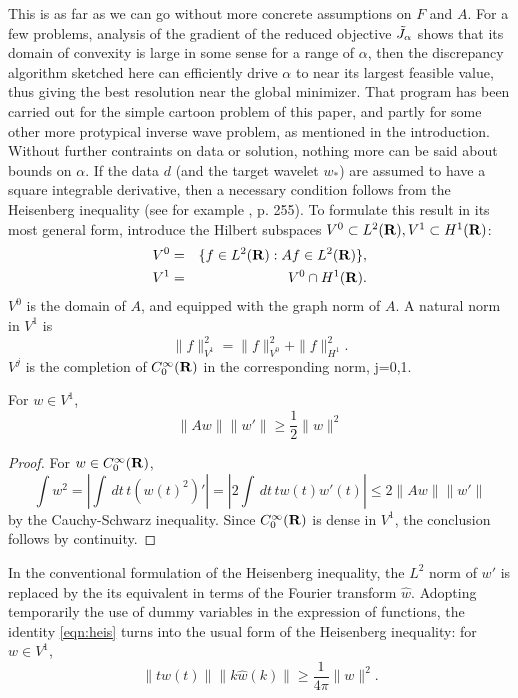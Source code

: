 This is as far as we can go without more concrete assumptions on $F$ and $A$. For a few problems, analysis of the gradient of the reduced objective $\tilde{J}_{\alpha}$ shows that its  domain of convexity is large in some sense for a range of $\alpha$, then the discrepancy algorithm sketched here can efficiently drive $\alpha$ to near its largest feasible value, thus giving the best resolution near the global minimizer. That program has been carried out for the simple cartoon problem of this paper, and partly for some other more protypical inverse wave problem, as mentioned in the introduction.
Without further contraints on data or solution, nothing more can be
said about bounds on $\alpha$. If the data $d$ (and the target wavelet
$w_*$) are assumed to have a square integrable derivative, then a
necessary condition follows from the Heisenberg
inequality (see for example \cite{Folland:07}, p. 255). To formulate
this result in its most general form, introduce the Hilbert subspaces
$V^0 \subset L^2({\bf R}), V^1 \subset H^1({\bf R})$:
\begin{eqnarray}
  V^0 & = & \{ f \in L^2({\bf R}): Af \in L^2({\bf R})\}, \nonumber\\
  V^1 & = & V^0 \cap H^1({\bf R}).
            \label{eqn:vdef}
\end{eqnarray}
$V^0$ is the domain of $A$, and equipped with the graph norm of $A$. A
natural norm in $V^1$ is
\[
  \|f\|^2_{V^1} = \|f\|_{V^0}^2 + \|f\|_{H^1}^2.
\]
$V^j$ is the completion of $C_0^{\infty}({\bf R})$ in the corresponding
norm, j=0,1.

\begin{proposition}
  \label{thm:heis}
For $w \in V^1$,
  \begin{equation}
    \label{eqn:heis}
    \|Aw\|\|w'\| \ge \frac{1}{2}\|w\|^2
  \end{equation}
\end{proposition}

\begin{proof}
  For $w \in C_0^{\infty}({\bf R})$,
  \[
    \int w^2 = \left|\int\,dt\, t (w(t)^2)' \right|= \left|2\int\,dt\,tw(t)w'(t)\right| \le
    2\|Aw\| \|w'\|
  \]
  by the Cauchy-Schwarz inequality. Since $C_0^{\infty}({\bf R})$ is dense
  in $V^1$, the conclusion follows by continuity.
\end{proof}

In the conventional formulation of the Heisenberg inequality, the $L^2$ norm of
$w'$ is replaced by the its equivalent in terms of the Fourier
transform $\hat{w}$. Adopting temporarily the use of dummy variables
in the expression of functions, the identity \ref{eqn:heis} turns into
the usual form of the Heisenberg inequality: for $w \in V^1$,
\begin{equation}
\label{eqn:fheis}
\|tw(t)\|\|k\hat{w}(k)\| \ge \frac{1}{4\pi}\|w\|^2.
\end{equation}

